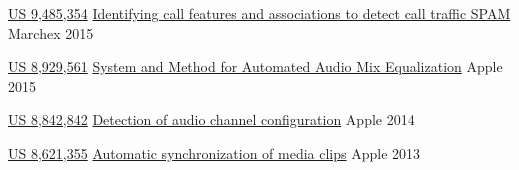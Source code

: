 
\begin{cvhonors}

  \cvhonor
    {\href{https://patents.google.com/patent/US9485354B1/en?inventor=Iroro+Orife}{US 9,485,354}} %
    {\href{https://patents.google.com/patent/US9485354B1/en?inventor=Iroro+Orife}{Identifying call features and associations to detect call traffic SPAM}} %
    {Marchex} %
    {2015} %

  \cvhonor
    {\href{https://patents.google.com/patent/US20120237040A1/en?inventor=Iroro+Orife}{US 8,929,561}} %
    {\href{https://patents.google.com/patent/US20120237040A1/en?inventor=Iroro+Orife}{System and Method for Automated Audio Mix Equalization}} %
    {Apple} %
    {2015} %

  \cvhonor
    {\href{https://patents.google.com/patent/US20120195433A1/en?inventor=Iroro+Orife}{US 8,842,842}} %
    {\href{https://patents.google.com/patent/US20120195433A1/en?inventor=Iroro+Orife}{Detection of audio channel configuration}} %
    {Apple} %
    {2014} %

  \cvhonor
    {\href{https://patents.google.com/patent/US20120198317A1/en?inventor=Iroro+Orife}{US 8,621,355}} %
    {\href{https://patents.google.com/patent/US20120198317A1/en?inventor=Iroro+Orife}{Automatic synchronization of media clips}} %
    {Apple} %
    {2013} %
    
\end{cvhonors}
